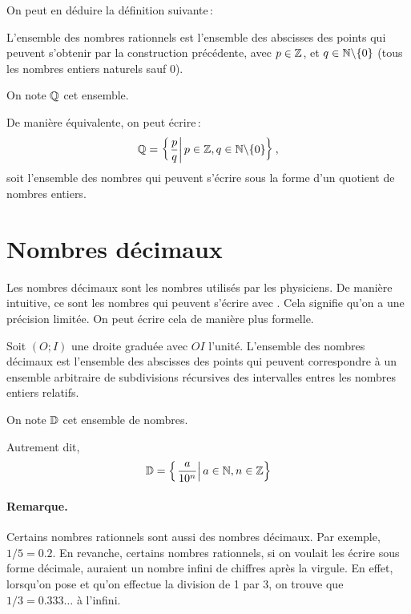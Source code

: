		On peut en déduire la définition suivante\,:
		\begin{defi}
			L'ensemble des nombres rationnels est l'ensemble des abscisses des points qui peuvent s'obtenir par la construction précédente, avec $p\in\mathbb{Z}$, et $q\in\mathbb{N}\backslash\{0\}$ (tous les nombres entiers naturels sauf $0$).

			On note $\mathbb{Q}$ cet ensemble.

			De manière équivalente, on peut écrire\,:
			\begin{equation}
				\mathbb{Q}=\left\{\left.\frac{p}{q}\right|p\in\mathbb{Z}, q\in\mathbb{N}\backslash\{0\}\right\},
			\end{equation}
			soit l'ensemble des nombres qui peuvent s'écrire sous la forme d'un quotient de nombres entiers.

		\end{defi}

	\section{Nombres décimaux}
		Les nombres décimaux sont les nombres utilisés par les physiciens. De manière intuitive, ce sont les nombres qui peuvent s'écrire avec . Cela signifie qu'on a une précision limitée. On peut écrire cela de manière plus formelle.

		\begin{defi}
			Soit $(O;I)$ une droite graduée avec $OI$ l'unité. L'ensemble des nombres décimaux est l'ensemble des abscisses des points qui peuvent correspondre à un ensemble arbitraire de subdivisions récursives des intervalles entres les nombres entiers relatifs. 

			On note $\mathbb{D}$ cet ensemble de nombres.

			Autrement dit, 
			\begin{equation}
				\mathbb{D}=\left\{\left.\frac{a}{10^n}\right| a\in\mathbb{N}, n\in\mathbb{Z}\right\}
			\end{equation}
		\end{defi}

		\paragraph{Remarque.} Certains nombres rationnels sont aussi des nombres décimaux. Par exemple, $1/5=0.2$. En revanche, certains nombres rationnels, si on voulait les écrire sous forme décimale, auraient un nombre infini de chiffres après la virgule. En effet, lorsqu'on pose et qu'on effectue la division de 1 par 3, on trouve que $1/3=0.333\ldots$ à l'infini.

